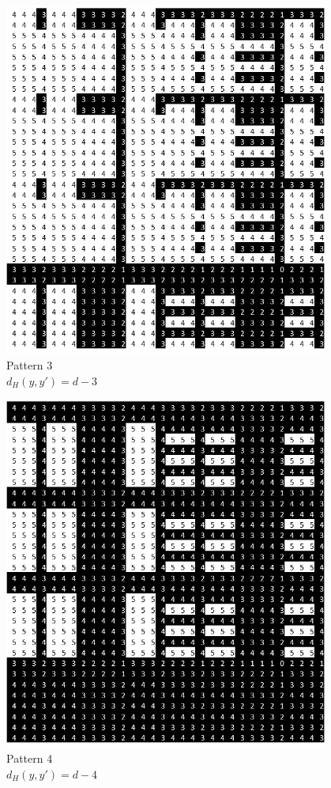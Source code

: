 \documentclass[oneside,12pt]{DISCSthesis}
\begin{document}
{\begin{figure}[h]
			\\\ \\\ \\
			\begin{minipage}{.33\textwidth}\centering\includegraphics[width=0.95\textwidth]{img/3}\\ Pattern 3 \\$d_H(y,y') = d-3$ \end{minipage}
			\begin{minipage}{.33\textwidth}\centering\includegraphics[width=0.95\textwidth]{img/4}\\ Pattern 4 \\$d_H(y,y') = d-4$ \end{minipage}

\end{figure}}
\end{document}
